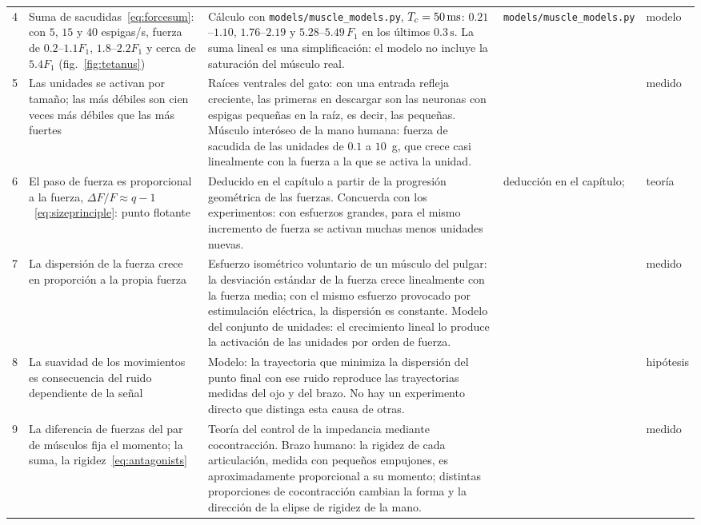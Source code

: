 {\begin{longtable}{>{\raggedright}p{0.5cm}>{\raggedright}p{4.0cm}>{\raggedright}p{5.6cm}>{\raggedright}p{2.3cm}>{\raggedright\arraybackslash}p{1.7cm}}
4 & Suma de sacudidas~\eqref{eq:forcesum}: con $5$, $15$ y $40$ espigas/s, fuerza de $0.2$--$1.1F_1$, $1.8$--$2.2F_1$ y cerca de $5.4F_1$ (fig.~\ref{fig:tetanus}) & Cálculo con \texttt{models/\allowbreak muscle\_\allowbreak models.py}, $T_c=50\,\text{ms}$: $0.21$--$1.10$, $1.76$--$2.19$ y $5.28$--$5.49\,F_1$ en los últimos $0.3\,\text{s}$. La suma lineal es una simplificación: el modelo no incluye la saturación del músculo real. & \texttt{models/\allowbreak muscle\_\allowbreak models.py} & modelo \\
5 & Las unidades se activan por tamaño; las más débiles son cien veces más débiles que las más fuertes & Raíces ventrales del gato: con una entrada refleja creciente, las primeras en descargar son las neuronas con espigas pequeñas en la raíz, es decir, las pequeñas. Músculo interóseo de la mano humana: fuerza de sacudida de las unidades de $0.1$ a $10$~g, que crece casi linealmente con la fuerza a la que se activa la unidad. & \cite{Henneman1957, MilnerBrown1973rec} & medido \\
6 & El paso de fuerza es proporcional a la fuerza, $\Delta F/F\approx q-1$~\eqref{eq:sizeprinciple}: punto flotante & Deducido en el capítulo a partir de la progresión geométrica de las fuerzas. Concuerda con los experimentos: con esfuerzos grandes, para el mismo incremento de fuerza se activan muchas menos unidades nuevas. & deducción en el capítulo; \cite{MilnerBrown1973rec} & teoría \\
7 & La dispersión de la fuerza crece en proporción a la propia fuerza & Esfuerzo isométrico voluntario de un músculo del pulgar: la desviación estándar de la fuerza crece linealmente con la fuerza media; con el mismo esfuerzo provocado por estimulación eléctrica, la dispersión es constante. Modelo del conjunto de unidades: el crecimiento lineal lo produce la activación de las unidades por orden de fuerza. & \cite{Jones2002sdn} & medido \\
8 & La suavidad de los movimientos es consecuencia del ruido dependiente de la señal & Modelo: la trayectoria que minimiza la dispersión del punto final con ese ruido reproduce las trayectorias medidas del ojo y del brazo. No hay un experimento directo que distinga esta causa de otras. & \cite{HarrisWolpert1998} & hipótesis \\
9 & La diferencia de fuerzas del par de músculos fija el momento; la suma, la rigidez~\eqref{eq:antagonists} & Teoría del control de la impedancia mediante cocontracción. Brazo humano: la rigidez de cada articulación, medida con pequeños empujones, es aproximadamente proporcional a su momento; distintas proporciones de cocontracción cambian la forma y la dirección de la elipse de rigidez de la mano. & \cite{Hogan1984, GomiOsu1998stiff} & medido \\

\end{longtable}}
